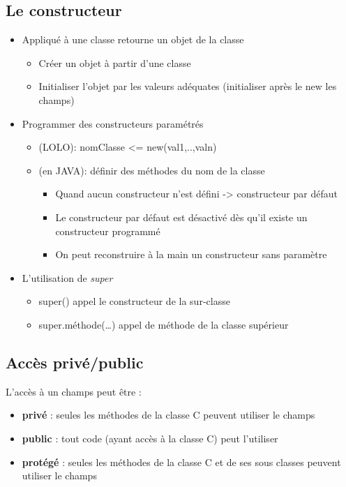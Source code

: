 \documentclass{article}
\begin{document}
\subsection{Le constructeur}
\begin{itemize}
	\item Appliqué à une classe retourne un objet de la classe
	\begin{itemize}
		\item Créer un objet à partir d'une classe
		\item Initialiser l'objet par les valeurs adéquates (initialiser 
		après le new les champs)
	\end{itemize}
	\item Programmer des constructeurs paramétrés
	\begin{itemize}
		\item (LOLO): nomClasse <= new(val1,..,valn)
		\item (en JAVA): définir des méthodes du nom de la classe
		\begin{itemize}
			\item Quand aucun constructeur n'est défini -> constructeur par défaut
			\item Le constructeur par défaut est désactivé dès qu'il existe un 
				constructeur programmé
			\item On peut reconstruire à la main un constructeur sans paramètre
		\end{itemize}
	\end{itemize}
	\item L'utilisation de \emph{super}
	\begin{itemize}
		\item super() appel le constructeur de la sur-classe
		\item super.méthode(\dots) appel de méthode de la classe supérieur
	\end{itemize}
\end{itemize}

\subsection{Accès privé/public}

L'accès à un champs peut être : 
\begin{itemize}
	\item \textbf{privé} : seules les méthodes de la classe C peuvent utiliser
le champs
	\item \textbf{public} : tout code (ayant accès à la classe C) peut l’utiliser
	\item \textbf{protégé} : seules les méthodes de la classe C et de ses sous
classes peuvent utiliser le champs
\end{itemize}
\end{document}

